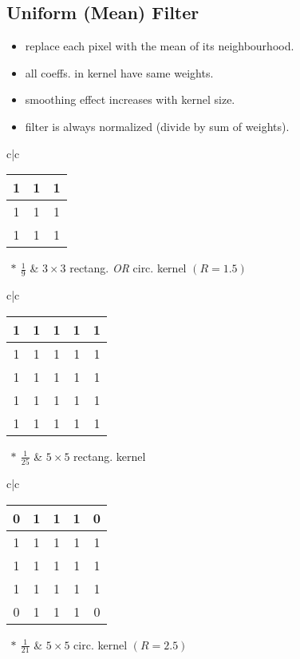 \subsection{Uniform (Mean) Filter}
\begin{itemize}
  \item replace each pixel with the mean of its neighbourhood.
  \item all coeffs. in kernel have same weights.
  \item smoothing effect increases with kernel size.
  \item filter is always normalized (divide by sum of weights).
\end{itemize}
\begin{tabular}{c|c}
  \begin{tabular}{|c|c|c|}
  \hline
  1 & 1 & 1\\
  \hline
  1 & 1 & 1\\
  \hline
  1 & 1 & 1\\
  \hline
  \end{tabular}$\ *\ \frac{1}{9}$
  & $3 \times 3$ rectang. \emph{OR} circ. kernel $(R=1.5)$
\end{tabular}

\begin{tabular}{c|c}
  \begin{tabular}{|c|c|c|c|c|}
  \hline
  1 & 1 & 1 & 1 & 1\\
  \hline
  1 & 1 & 1 & 1 & 1\\
  \hline
  1 & 1 & 1 & 1 & 1\\
  \hline
  1 & 1 & 1 & 1 & 1\\
  \hline
  1 & 1 & 1 & 1 & 1\\
  \hline
  \end{tabular}$\ *\ \frac{1}{25}$
  &  $5 \times 5$ rectang. kernel
\end{tabular}

\begin{tabular}{c|c}
  \begin{tabular}{|c|c|c|c|c|}
  \hline
  0 & 1 & 1 & 1 & 0\\
  \hline
  1 & 1 & 1 & 1 & 1\\
  \hline
  1 & 1 & 1 & 1 & 1\\
  \hline
  1 & 1 & 1 & 1 & 1\\
  \hline
  0 & 1 & 1 & 1 & 0\\
  \hline
  \end{tabular}$\ *\ \frac{1}{21}$
  &  $5 \times 5$ circ. kernel $(R=2.5)$
\end{tabular}

